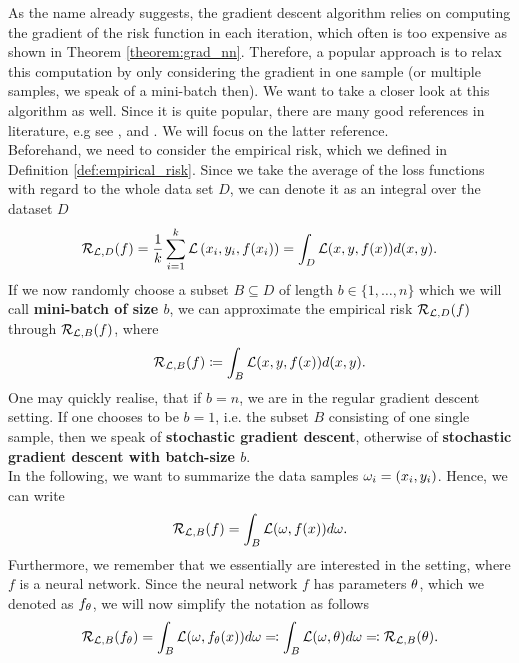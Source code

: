 As the name already suggests, the gradient descent algorithm relies on computing the gradient of the risk function in each iteration, which often is too expensive as shown in Theorem \ref{theorem:grad_nn}.
Therefore, a popular approach is to relax this computation by only considering the gradient in one sample (or multiple samples, we speak of a mini-batch then). We want to take a closer look at this algorithm as well. Since it is quite popular, there are many good references in literature, e.g see \cite[Chapter~13.3.2]{sra2012optimization}, \cite[Chapter~4.2]{saad2009line} and \cite{turinici2021convergence}. We will focus on the latter reference.\\
Beforehand, we need to consider the empirical risk, which we defined in Definition \ref{def:empirical_risk}. Since we take the average of the loss functions with regard to the whole data set $D$, we can denote it as an integral over the dataset $D$
\begin{align*}
\operatorname{\mathcal{R}}_{\operatorname{\mathcal{L}}, D} (f) = \frac{1}{k} \sum_{i=1}^{k} \operatorname{\mathcal{L}}\left(x_i, y_i, f(x_i)\right) = \int_{D} \operatorname{\mathcal{L}}(x,y,f(x)) d(x,y).
\end{align*}
If we now randomly choose a subset $B \subseteq D$ of length $b\in\{1,\ldots,n\}$ which we will call \textbf{mini-batch of size $b$}, we can approximate the empirical risk $\operatorname{\mathcal{R}}_{\operatorname{\mathcal{L}}, D} (f)$ through $\operatorname{\mathcal{R}}_{\operatorname{\mathcal{L}}, B} (f)$, where
\begin{align*}
\operatorname{\mathcal{R}}_{\operatorname{\mathcal{L}},B}(f) \coloneqq \int_{B}\operatorname{\mathcal{L}}(x, y, f(x)) d(x,y).
\end{align*}
One may quickly realise, that if $b=n$, we are in the regular gradient descent setting. If one chooses to be $b=1$, i.e. the subset $B$ consisting of one single sample, then we speak of \textbf{stochastic gradient descent}, otherwise of \textbf{stochastic gradient descent with batch-size $b$}.\\
In the following, we want to summarize the data samples $\omega_i=(x_i,y_i)$. Hence, we can write
\begin{align*}
\operatorname{\mathcal{R}}_{\operatorname{\mathcal{L}},B}(f) = \int_{B}\operatorname{\mathcal{L}}(\omega, f(x)) d\omega.
\end{align*}
Furthermore, we remember that we essentially are interested in the setting, where $f$ is a neural network. Since the neural network $f$ has parameters $\theta$, which we denoted as $f_{\theta}$, we will now simplify the notation as follows
\begin{align*}
\operatorname{\mathcal{R}}_{\operatorname{\mathcal{L}},B}(f_{\theta}) = \int_{B}\operatorname{\mathcal{L}}(\omega, f_{\theta}(x)) d\omega \eqqcolon \int_{B}\operatorname{\mathcal{L}}(\omega,\theta) d\omega \eqqcolon \operatorname{\mathcal{R}}_{\operatorname{\mathcal{L}},B}(\theta).
\end{align*}
